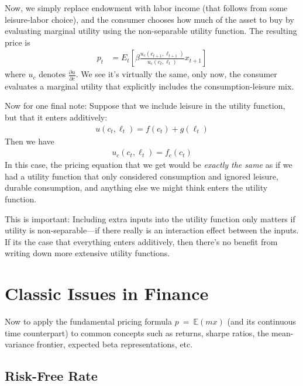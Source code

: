 \documentclass[a4paper,12pt]{scrartcl}
\begin{document}
Now, we simply replace endowment with labor income (that follows from
some leisure-labor choice), and the consumer chooses how much of the
asset to buy by evaluating marginal utility using the non-separable
utility function. The resulting price is
\begin{align}
    p_t &= E_t\left[
  \beta\frac{u_c(c_{t+1},\ell_{t+1})}{u_c(c_{t},\ell_t)} x_{t+1} \right]
  \label{nonsep}
\end{align}
where $u_c$ denotes $\frac{\partial u}{\partial c}$. We see it's
virtually the same, only now, the consumer evaluates a marginal utility
that explicitly includes the consumption-leisure mix.

Now for one final note: Suppose that we include leisure in the utility function, but that it enters additively:
\begin{align*}
  u(c_t,\ell_t) = f(c_t) + g(\ell_t)
\end{align*}
Then we have
\begin{align*}
  u_c(c_t,\ell_t) = f_c(c_t)
\end{align*}
In this case, the pricing equation that we get would be \emph{exactly
the same} as if we had a utility function that only considered
consumption and ignored leisure, durable consumption, and anything else
we might think enters the utility function.

This is important: Including extra inputs into the utility function only
matters if utility is non-separable---if there really is an interaction
effect between the inputs. If its the case that everything enters
additively, then there's no benefit from writing down more extensive
utility functions.


\newpage
\section{Classic Issues in Finance}

Now to apply the fundamental pricing formula $p~=~\mathbb{E}(mx)$ (and
its continuous time counterpart) to common concepts such as returns,
sharpe ratios, the mean-variance frontier, expected beta
representations, etc.

\subsection{Risk-Free Rate}
\end{document}
